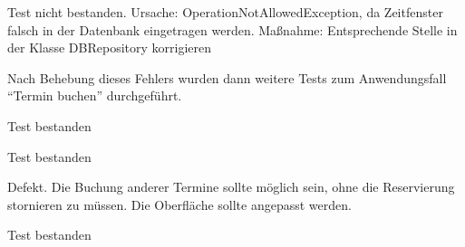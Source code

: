 {Test nicht bestanden. Ursache: OperationNotAllowedException, da Zeitfenster falsch in der Datenbank eingetragen werden. Maßnahme: Entsprechende Stelle in der Klasse DBRepository korrigieren}

Nach Behebung dieses Fehlers wurden dann weitere Tests zum Anwendungsfall "`Termin buchen"' durchgeführt.

{Test bestanden}

{Test bestanden}

{Defekt. Die Buchung anderer Termine sollte möglich sein, ohne die Reservierung stornieren zu müssen. Die Oberfläche sollte angepasst werden.}

{Test bestanden}
